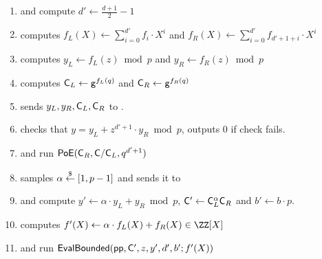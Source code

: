 \documentclass{article}
\theoremstyle{definition}
\begin{document}
\begin{mdframed}
\begin{minipage}{\textwidth}
\begin{enumerate}[nolistsep]
        \item \pcind[1] \prover and \verifier compute $d' \gets \frac{d+1}{2} - 1$
        \item \pcind[1] \prover computes $f_L(X) \gets \sum\limits_{i=0}^{d'} f_i \cdot X^i$ and $f_R(X)\gets\sum\limits_{i=0}^{d'} f_{d'+1+i}\cdot X^{i}$
        \item \pcind[1] \prover computes $y_L\gets f_L(z) \bmod p$ and $y_R\gets f_R(z)\bmod p$
        \item \pcind[1] \prover computes $\mathsf{C}_L \gets \mathsf{g}^{f_L(q)}$ and $\mathsf{C}_R \gets \mathsf{g}^{f_R(q)}$
        \item \pcind[1] \prover sends $y_L,y_R, \mathsf{C}_L, \mathsf{C}_R$ to \verifier. 
        \item \pcind[1] \verifier checks that $y=y_L+z^{d'+1}\cdot y_R \bmod p$, outputs $0$ if check fails.
        \item \pcind[1] \label{line:PoE} \prover and \verifier run $\textsf{{PoE}}(\mathsf{C}_R, \mathsf{C}/\mathsf{C}_L, q^{d'+1})$
        \item \pcind[1] \verifier samples $\alpha \overset{\$}{\gets} [1,p-1]$ and sends it to \prover
        \item \pcind[1] \prover and \verifier compute $y'\gets\alpha \cdot y_L +y_R \bmod p$, $\mathsf{C}' \gets \mathsf{C}_L^\alpha  \mathsf{C}_R$ and $b'\gets b\cdot p$. 
        \item \pcind[1] \prover computes $f'(X) \gets \alpha \cdot f_L(X) + f_R(X) \in \ZZ[X]$ 
        \item \pcind[1] \prover and \verifier run $\textsf{{EvalBounded}}(\textsf{pp}, \mathsf{C}', z, y', d',b' ; f'(X))$
               \end{enumerate}
      \end{minipage}
\end{mdframed}
\end{document}
